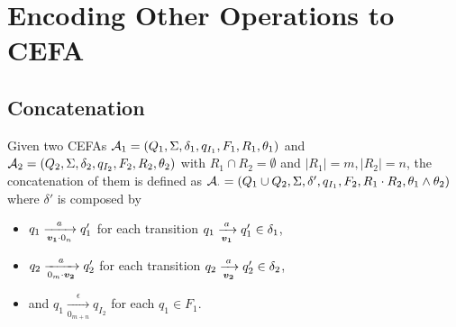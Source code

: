 \section{Encoding Other Operations to CEFA}

\subsection{Concatenation}\label{subsec:con}
Given two CEFAs $\mathcal{A}_1 = (Q_1, \Sigma, \delta_1, q_{I_1}, F_1, R_1, \theta_1)$ and $\mathcal{A}_2 = (Q_2, \Sigma, \delta_2, q_{I_2}, F_2, R_2, \theta_2)$ with $R_1\cap R_2= \emptyset$ and $|R_1|=m,|R_2|=n$, the concatenation of them is defined as $\mathcal{A}_{\cdot}=(Q_1\cup Q_2, \Sigma, \delta', q_{I_1}, F_2, R_1\cdot R_2, \theta_1\wedge\theta_2)$ where $\delta'$ is composed by
\begin{itemize}
  \item $q_1\xrightarrow[\myvec{v_1}\cdot 0_n]{a} q_1'$ for each transition $q_1\xrightarrow[\myvec{v_1}]{a} q_1' \in \delta_1$,
  \item $q_2\xrightarrow[0_m\cdot\myvec{v_2}]{a} q_2'$ for each transition $q_2\xrightarrow[\myvec{v_2}]{a} q_2' \in \delta_2$,
  \item and $q_1\xrightarrow[0_{m+n}]{\epsilon} q_{I_2}$ for each $q_1\in F_1$.
\end{itemize}
